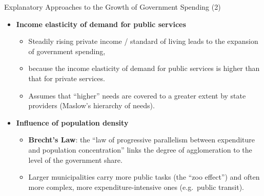 \documentclass[11pt,aspectratio=169]{beamer}
\begin{document}
\begin{frame}{Explanatory Approaches to the Growth of Government Spending (2)}

	\begin{itemize}
		\item \textbf{Income elasticity of demand for public services}
		\begin{itemize}
			\item Steadily rising private income / standard of living leads to the expansion of government spending,
			\item because the income elasticity of demand for public services is higher than that for private services.
			\item Assumes that ``higher'' needs are covered to a greater extent by state providers (Maslow's hierarchy of needs).
		\end{itemize}
		\item \textbf{Influence of population density}
		\begin{itemize}
			\item \textbf{Brecht's Law}: the ``law of progressive parallelism between expenditure and population concentration'' links the degree of agglomeration to the level of the government share.
			\item Larger municipalities carry more public tasks (the ``zoo effect'') and often more complex, more expenditure-intensive ones (e.g.\ public transit).
		\end{itemize}
	\end{itemize}

\end{frame}
\end{document}
